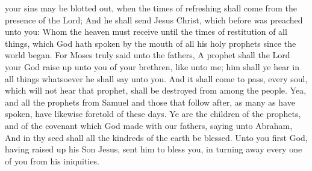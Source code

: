 {your
sins may be blotted
out,
when the
times of
refreshing shall
come
from the
presence of the
Lord;
And he shall
send
Jesus
Christ, which before was
preached unto
you:
Whom the
heaven
must
receive
until the
times of
restitution of all
things,
which
God hath
spoken
by the
mouth of
all
his
holy
prophets
since the world
began.
For
Moses
truly
said
unto the
fathers, A
prophet
shall the
Lord
your
God raise
up unto
you
of
your
brethren, like
unto
me;
him shall ye
hear
in all
things
whatsoever he shall
say
unto
you.
And it shall come to
pass,
{}
every
soul,
which
will
not
hear
that
prophet, shall be
destroyed
from among the
people.
Yea,
and
all the
prophets
from
Samuel
and those that follow
after, as many
as have
spoken,
have
likewise
foretold
of
these
days.
Ye
are the
children of the
prophets,
and of the
covenant
which
God
made
with
our
fathers,
saying
unto
Abraham,
And
in
thy
seed
shall
all the
kindreds of the
earth be
blessed.
Unto
you
first
God, having raised
up
his
Son
Jesus,
sent
him to
bless
you,
in turning
away every one of
you
from
his
iniquities.

}
